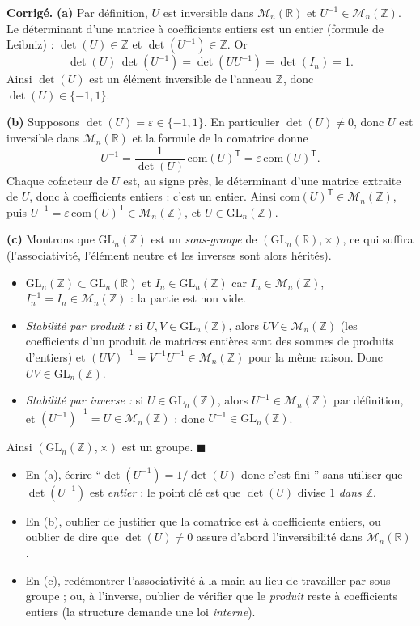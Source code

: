 \documentclass[11pt,a4paper]{article}
\newenvironment{corrige}
  {\par\medskip\noindent
   \begin{tcolorbox}[blanker, breakable,
     borderline west={2.5pt}{0pt}{vertP},
     left=10pt, top=2pt, bottom=2pt]
   {\color{vertP}\bfseries Corrigé.}\hspace{0.5em}\ignorespaces}
  {\hfill$\blacksquare$\end{tcolorbox}\medskip}
\newcommand{\og}{``}
\newcommand{\fg}{''}
\newcommand{\Z}{\mathbb{Z}}
\newcommand{\R}{\mathbb{R}}
\newcommand{\Mn}[1][n]{\mathcal{M}_{#1}}
\newcommand{\GLn}[1][n]{\mathrm{GL}_{#1}}
\newcommand{\T}{\mathsf{T}}               %
\begin{document}
\begin{corrige}
\textbf{(a)} Par définition, $U$ est inversible dans $\Mn(\R)$ et
$U^{-1}\in\Mn(\Z)$. Le déterminant d'une matrice à coefficients
entiers est un entier (formule de Leibniz) : $\det(U)\in\Z$ et
$\det(U^{-1})\in\Z$. Or
\[
\det(U)\,\det(U^{-1})=\det(UU^{-1})=\det(I_n)=1 .
\]
Ainsi $\det(U)$ est un élément inversible de l'anneau $\Z$, donc
$\det(U)\in\{-1,1\}$.

\textbf{(b)} Supposons $\det(U)=\varepsilon\in\{-1,1\}$. En
particulier $\det(U)\neq 0$, donc $U$ est inversible dans $\Mn(\R)$
et la formule de la comatrice donne
\[
U^{-1}=\frac{1}{\det(U)}\,{}\mathrm{com}(U)^{\T}
=\varepsilon\,\mathrm{com}(U)^{\T}.
\]
Chaque cofacteur de $U$ est, au signe près, le déterminant d'une
matrice extraite de $U$, donc à coefficients entiers : c'est un
entier. Ainsi $\mathrm{com}(U)^{\T}\in\Mn(\Z)$, puis
$U^{-1}=\varepsilon\,\mathrm{com}(U)^{\T}\in\Mn(\Z)$, et
$U\in\GLn(\Z)$.

\textbf{(c)} Montrons que $\GLn(\Z)$ est un \emph{sous-groupe} de
$(\GLn(\R),\times)$, ce qui suffira (l'associativité, l'élément
neutre et les inverses sont alors hérités).
\begin{itemize}[leftmargin=1.6em, itemsep=1pt]
\item $\GLn(\Z)\subset\GLn(\R)$ et $I_n\in\GLn(\Z)$ car
$I_n\in\Mn(\Z)$, $I_n^{-1}=I_n\in\Mn(\Z)$ : la partie est non vide.
\item \emph{Stabilité par produit :} si $U,V\in\GLn(\Z)$, alors
$UV\in\Mn(\Z)$ (les coefficients d'un produit de matrices entières
sont des sommes de produits d'entiers) et
$(UV)^{-1}=V^{-1}U^{-1}\in\Mn(\Z)$ pour la même raison. Donc
$UV\in\GLn(\Z)$.
\item \emph{Stabilité par inverse :} si $U\in\GLn(\Z)$, alors
$U^{-1}\in\Mn(\Z)$ par définition, et $(U^{-1})^{-1}=U\in\Mn(\Z)$ ;
donc $U^{-1}\in\GLn(\Z)$.
\end{itemize}
Ainsi $(\GLn(\Z),\times)$ est un groupe.
\end{corrige}

\begin{pieges}
\begin{itemize}[leftmargin=1.4em, itemsep=2pt]
\item En (a), écrire \og $\det(U^{-1})=1/\det(U)$ donc c'est fini \fg{}
sans utiliser que $\det(U^{-1})$ est \emph{entier} : le point clé est
que $\det(U)$ divise $1$ \emph{dans $\Z$}.
\item En (b), oublier de justifier que la comatrice est à coefficients
entiers, ou oublier de dire que $\det(U)\neq 0$ assure d'abord
l'inversibilité dans $\Mn(\R)$.
\item En (c), redémontrer l'associativité à la main au lieu de
travailler par sous-groupe ; ou, à l'inverse, oublier de vérifier que
le \emph{produit} reste à coefficients entiers (la structure demande
une loi \emph{interne}).
\end{itemize}
\end{pieges}
\end{document}
